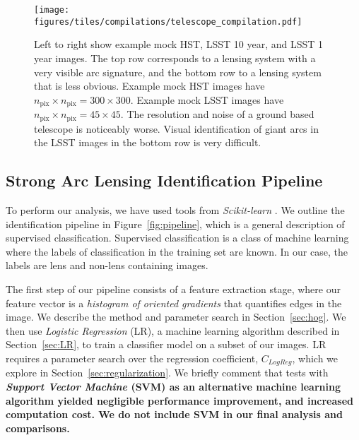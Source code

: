 \documentclass{emulateapj}
\newcommand{\todo}[1]{{\bf\color{blue} #1}}
\begin{document}
\begin{figure*}[t]\label{fig:mockimages}
\begin{center}
\texttt{[image: figures/tiles/compilations/telescope\_compilation.pdf]}
\caption{Left to right show example mock HST, LSST 10 year, and LSST 1
  year images.  The top row corresponds to a lensing system with a
  very visible arc signature, and the bottom row to a lensing system
  that is less obvious.  Example mock HST images have
  $n_\text{pix}\times n_\text{pix}=300\times300$.  Example mock LSST
  images have $n_\text{pix}\times n_\text{pix}=45\times45$.  The
  resolution and noise of a ground based telescope is noticeably
  worse. Visual identification of giant arcs in the LSST images in the
  bottom row is very difficult.}
\end{center}
\end{figure*}

\subsection{Strong Arc Lensing Identification Pipeline}

To perform our analysis, we have used tools from {\em Scikit-learn}
\citep{pedregosa_etal12}.  We outline the identification pipeline in
Figure~\ref{fig:pipeline}, which is a general description of
supervised classification.  Supervised classification is a class of
machine learning where the labels of classification in the training
set are known.  In our case, the labels are lens and non-lens
containing images.

The first step of our pipeline consists of a feature extraction stage,
where our feature vector is a {\em histogram of oriented gradients}
\citep{dalalandtriggs_05} that quantifies edges in the image.  We
describe the method and parameter search in Section~\ref{sec:hog}.  We
then use {\em Logistic Regression} (LR), a machine learning algorithm
described in Section~\ref{sec:LR}, to train a classifier model on a
subset of our images.  LR requires a parameter search over the
regression coefficient, $C_{LogReg}$, which we explore in
Section~\ref{sec:regularization}.  We briefly comment that tests with
\todo{{\em Support Vector Machine} (SVM) as an alternative machine
  learning algorithm yielded negligible performance improvement, and
  increased computation cost.  We do not include SVM in our final
  analysis and comparisons.}
\end{document}
